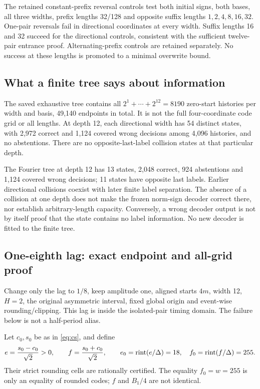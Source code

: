 The retained constant-prefix reversal controls test both initial signs, both bases, all three widths, prefix lengths 32/128 and opposite suffix lengths $1,2,4,8,16,32$. One-pair reversals fail in directional coordinates at every width. Suffix lengths 16 and 32 succeed for the directional controls, consistent with the sufficient twelve-pair entrance proof. Alternating-prefix controls are retained separately. No success at these lengths is promoted to a minimal overwrite bound.

\subsection{What a finite tree says about information}
The saved exhaustive tree contains all $2^1+\cdots+2^{12}=8190$ zero-start histories per width and basis, 49,140 endpoints in total. It is not the full four-coordinate code grid or all lengths. At depth 12, each directional width has 54 distinct states, with 2,972 correct and 1,124 covered wrong decisions among 4,096 histories, and no abstentions. There are no opposite-last-label collision states at that particular depth.

The Fourier tree at depth 12 has 13 states, 2,048 correct, 924 abstentions and 1,124 covered wrong decisions; 11 states have opposite last labels. Earlier directional collisions coexist with later finite label separation. The absence of a collision at one depth does not make the frozen norm-sign decoder correct there, nor establish arbitrary-length capacity. Conversely, a wrong decoder output is not by itself proof that the state contains no label information. No new decoder is fitted to the finite tree.

\subsection{One-eighth lag: exact endpoint and all-grid proof}
Change only the lag to $1/8$, keep amplitude one, aligned starts $4m$, width 12, $H=2$, the original asymmetric interval, fixed global origin and event-wise rounding/clipping. This lag is inside the isolated-pair timing domain. The failure below is not a half-period alias.

Let $c_0,s_0$ be as in \eqref{eq:cs}, and define
\[
 e=\frac{s_0-c_0}{\sqrt2}>0,\qquad
 f=\frac{s_0+c_0}{\sqrt2},\qquad
 e_0=\operatorname{rint}(e/\Delta)=18,\quad f_0=\operatorname{rint}(f/\Delta)=255.
\]
Their strict rounding cells are rationally certified. The equality $f_0=w=255$ is only an equality of rounded codes; $f$ and $B_1/4$ are not identical.

